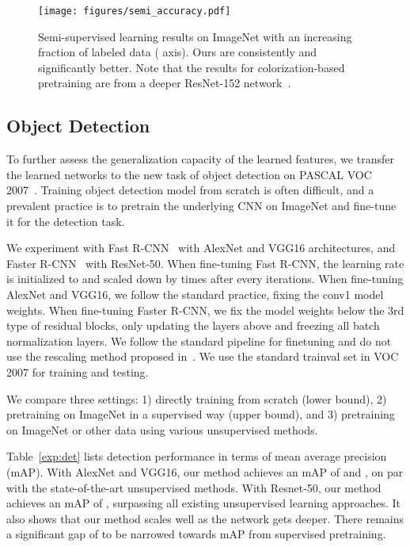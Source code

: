 \begin{figure}[t]
	\centering
	\texttt{[image: figures/semi\_accuracy.pdf]}
	\caption{\small
		Semi-supervised learning results on ImageNet with an increasing fraction of labeled data ( axis).  Ours are consistently and significantly better.
		Note that the results for colorization-based pretraining are from a deeper ResNet-152 network~\cite{larsson2017colorization}.
}
	\label{fig:semi}
\vspace{-6pt}
\end{figure}


\subsection{Object Detection}


To further assess the generalization capacity of the learned features, we
transfer the learned networks to the new task of object detection on PASCAL VOC 2007~\cite{everingham2010pascal}.
Training object detection model from scratch is often difficult, and a prevalent practice is to pretrain the underlying CNN on ImageNet and
fine-tune it for the detection task.

We experiment with
Fast R-CNN~\cite{girshick2015fast} with AlexNet and VGG16 architectures,
and Faster R-CNN~\cite{ren2015faster} with ResNet-50.
When fine-tuning Fast R-CNN, the learning rate is initialized to  and
scaled down by  times after every  iterations.
When fine-tuning AlexNet and VGG16, we follow the standard practice, fixing
the conv1 model weights.
When fine-tuning Faster R-CNN, we fix
the model weights below the 3rd type of residual blocks,
only updating the layers above and freezing all batch normalization layers.
We follow the standard pipeline for finetuning and do not use the rescaling method proposed in~\cite{doersch2015unsupervised}.
We use the standard trainval set in VOC 2007 for training and  testing.

We compare three settings:
1) directly training from scratch (lower bound),
2) pretraining on ImageNet in a supervised way (upper bound), and
3) pretraining on ImageNet or other data using various unsupervised methods.

Table~\ref{exp:det} lists detection performance in terms of mean average precision (mAP).
With AlexNet and VGG16, our method achieves an mAP of  and ,
on par with the state-of-the-art unsupervised methods.
With Resnet-50, our method achieves an mAP of ,
surpassing all existing unsupervised learning approaches.
It also shows that our method scales well as the network gets deeper.
There remains a significant gap of  to be narrowed towards mAP  from supervised pretraining.

